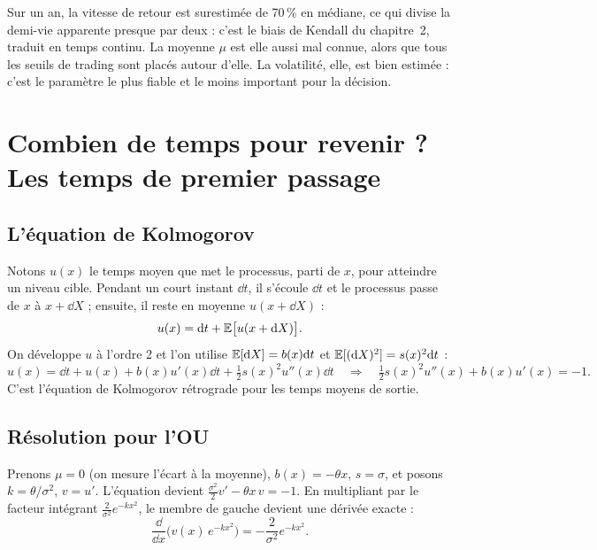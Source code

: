 \begin{pitfall}
Sur un an, la vitesse de retour est surestimée de 70\,\% en médiane, ce qui divise la demi-vie apparente presque par deux : c'est le biais de Kendall du chapitre~2, traduit en temps continu. La moyenne $\mu$ est elle aussi mal connue, alors que tous les seuils de trading sont placés autour d'elle. La volatilité, elle, est bien estimée : c'est le paramètre le plus fiable et le moins important pour la décision.
\end{pitfall}

\section{Combien de temps pour revenir ? Les temps de premier passage}

\subsection{L'équation de Kolmogorov}

Notons $u(x)$ le temps moyen que met le processus, parti de $x$, pour atteindre un niveau cible. Pendant un court instant $\dd t$, il s'écoule $\dd t$ et le processus passe de $x$ à $x + \dd X$ ; ensuite, il reste en moyenne $u(x+\dd X)$ :
\[
u(x) = \mathrm{d} t + \mathbb{E}\big[u(x + \mathrm{d} X)\big].
\]
On développe $u$ à l'ordre 2 et l'on utilise $\mathbb{E}[\mathrm{d} X] = b(x)\mathrm{d} t$ et $\mathbb{E}[(\mathrm{d} X)^2] = s(x)^2\mathrm{d} t$ :
\[
u(x) = \dd t + u(x) + b(x)u'(x)\dd t + \tfrac12 s(x)^2u''(x)\dd t \quad\Longrightarrow\quad \tfrac12 s(x)^2u''(x) + b(x)u'(x) = -1.
\]
C'est l'équation de Kolmogorov rétrograde pour les temps moyens de sortie.

\subsection{Résolution pour l'OU}

Prenons $\mu = 0$ (on mesure l'écart à la moyenne), $b(x) = -\theta x$, $s = \sigma$, et posons $k = \theta/\sigma^2$, $v = u'$. L'équation devient $\frac{\sigma^2}{2}v' - \theta x\,v = -1$. En multipliant par le facteur intégrant $\frac{2}{\sigma^2}e^{-kx^2}$, le membre de gauche devient une dérivée exacte :
\[
\frac{\dd}{\dd x}\Big(v(x)\,e^{-kx^2}\Big) = -\frac{2}{\sigma^2}e^{-kx^2}.
\]

